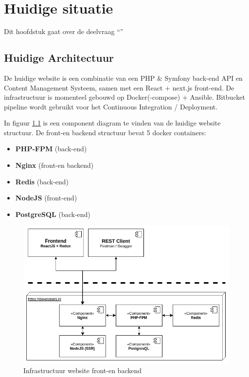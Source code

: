\chapter{Huidige situatie}

\label{Chapter4}

Dit hoofdstuk gaat over de deelvraag \enquote{\deelhuidig}

\section{Huidige Architectuur}
De huidige website is een combinatie van een PHP \& Symfony back-end API en Content Management Systeem, samen met een React + next.js front-end. De infrastructuur is momenteel gebouwd op Docker(-compose) + Ansible. Bitbucket pipeline wordt gebruikt voor het Continuous Integration / Deployment. 

In figuur \ref{fig:infra} is een component diagram te vinden van de huidige website structuur. De front-en backend structuur bevat 5 docker containers:
\begin{itemize}
	\item \textbf{PHP-FPM} (back-end)
	\item \textbf{Nginx} (front-en backend)
	\item \textbf{Redis} (back-end)
	\item \textbf{NodeJS} (front-end)
	\item \textbf{PostgreSQL} (back-end)
\end{itemize}

\begin{figure}
	\centering
	\includegraphics[width=13cm]{Figures/Infrastructure}
	\decoRule
	\caption[Infrastructuur]{Infrastructuur website front-en backend \parencite{Documentation}}
	\label{fig:infra}
\end{figure}

